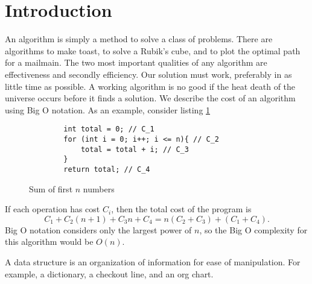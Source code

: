 \section{Introduction}
An algorithm is simply a method
to solve a class of problems.
There are algorithms to make
toast, to solve a Rubik's cube,
and to plot the optimal path
for a mailmain.
The two most important qualities
of any algorithm are effectiveness
and secondly efficiency. Our solution
must work, preferably in as little
time as possible. A working algorithm
is no good if the heat death of the
universe occurs before it finds a
solution.
We describe the cost of an algorithm
using Big O notation. As an example,
consider listing \ref{lst:nsum}
\begin{figure}
    \begin{lstlisting}
        int total = 0; // C_1
        for (int i = 0; i++; i <= n){ // C_2
            total = total + i; // C_3
        }
        return total; // C_4
    \end{lstlisting}
    \caption{Sum of first $n$ numbers}
    \label{lst:nsum}
\end{figure}
If each operation has cost $C_i$,
then the total cost of the program is
\begin{equation}
    C_1 + C_2 (n + 1) + C_3 n + C_4 = n(C_2 + C_3) + (C_1 + C_4).
\end{equation}
Big O notation considers only
the largest power of $n$, so the Big O complexity
for this algorithm would be $O(n)$.

A data structure is an
organization of information for
ease of manipulation. For
example, a dictionary,
a checkout line, and an
org chart.
